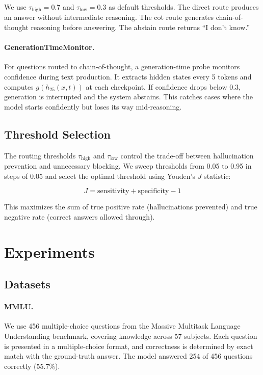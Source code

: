 \documentclass{article}
\begin{document}
We use $\tau_\text{high} = 0.7$ and $\tau_\text{low} = 0.3$ as default thresholds. The direct route produces an answer without intermediate reasoning. The cot route generates chain-of-thought reasoning before answering. The abstain route returns ``I don't know.''

\paragraph{GenerationTimeMonitor.}
For questions routed to chain-of-thought, a generation-time probe monitors confidence during text production. It extracts hidden states every 5 tokens and computes $g(h_{25}(x, t))$ at each checkpoint. If confidence drops below 0.3, generation is interrupted and the system abstains. This catches cases where the model starts confidently but loses its way mid-reasoning.

\subsection{Threshold Selection}

The routing thresholds $\tau_\text{high}$ and $\tau_\text{low}$ control the trade-off between hallucination prevention and unnecessary blocking. We sweep thresholds from 0.05 to 0.95 in steps of 0.05 and select the optimal threshold using Youden's $J$ statistic:

\begin{equation}
J = \text{sensitivity} + \text{specificity} - 1
\end{equation}

This maximizes the sum of true positive rate (hallucinations prevented) and true negative rate (correct answers allowed through).

\section{Experiments}

\subsection{Datasets}

\paragraph{MMLU.}
We use 456 multiple-choice questions from the Massive Multitask Language Understanding benchmark, covering knowledge across 57 subjects. Each question is presented in a multiple-choice format, and correctness is determined by exact match with the ground-truth answer. The model answered 254 of 456 questions correctly (55.7\%).
\end{document}
